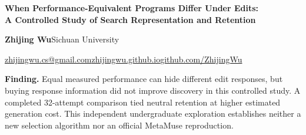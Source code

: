 \documentclass[10pt,letterpaper]{article}
\begin{document}
\thispagestyle{fancy}
{\sffamily\bfseries\fontsize{19.5}{22}\selectfont\color{ink}
When Performance-Equivalent Programs Differ Under Edits:\\[2pt]
A Controlled Study of Search Representation and Retention\par}
\vspace{5pt}
{\sffamily\fontsize{11}{13}\selectfont\textbf{Zhijing Wu}\quad Sichuan University\par}
{\sffamily\fontsize{9}{11}\selectfont\color{muted}\href{mailto:zhijingwu.cs@gmail.com}{zhijingwu.cs@gmail.com}\enspace\textbar\enspace\href{https://zhijingwu.github.io/}{zhijingwu.github.io}\enspace\textbar\enspace\href{https://github.com/ZhijingWu}{github.com/ZhijingWu}\par}
\vspace{5pt}
\textbf{Finding.} Equal measured performance can hide different edit responses, but buying response information did not improve discovery in this controlled study. A completed 32-attempt comparison tied neutral retention at higher estimated generation cost. This independent undergraduate exploration establishes neither a new selection algorithm nor an official MetaMuse reproduction.

\begin{center}

\end{center}
\end{document}
